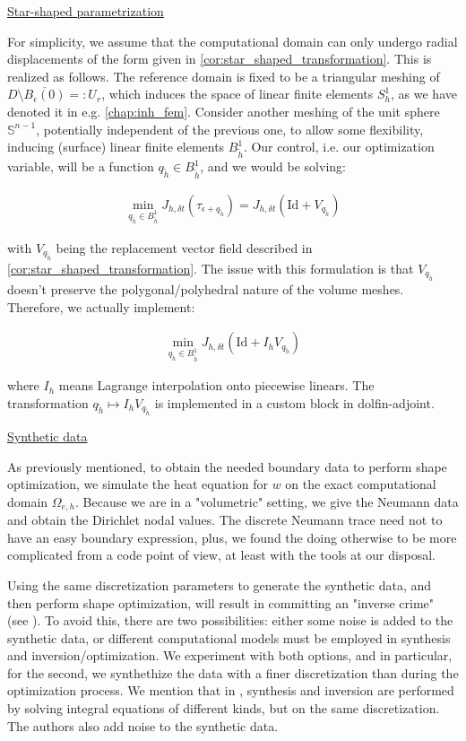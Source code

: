\documentclass[english,a4paper,9pt,oneside]{scrbook}	%
\theoremstyle{break}
\theoremstyle{remark}
\newcommand{\mS}{\mathbb{S}^{n-1}}
\newcommand{\id}{\text{Id}}
\newcommand{\eps}{\epsilon}
\begin{document}
\underline{Star-shaped parametrization}

For simplicity, we assume that the computational domain can only undergo radial displacements of the form given in \cref{cor:star_shaped_transformation}. This is realized as follows. The reference domain is fixed to be a triangular meshing of $D\setminus \overline{B_\epsilon(0)}=:U_r$, which induces the space of linear finite elements $S^1_h$, as we have denoted it in e.g. \cref{chap:inh_fem}. Consider another meshing of the unit sphere $\mS$, potentially independent of the previous one, to allow some flexibility, inducing (surface) linear finite elements $B^1_{\tilde{h}}$. Our control, i.e. our optimization variable, will be a function $ q_{\tilde{h}} \in B^1_{\tilde{h}}$, and we would be solving:

\begin{align*}
	\min_{q_{\tilde{h}} \in B^1_{\tilde{h}}} J_{h,\delta t}(\tau_{\eps+q_{\tilde{h}}}) = J_{h,\delta t }(\id  + V_{q_{\tilde{h}}})
\end{align*}

with $V_{q_{\tilde{h}}}$ being the replacement vector field described in  \cref{cor:star_shaped_transformation}. The issue with this formulation is that  $V_{q_{\tilde{h}}}$ doesn't preserve the polygonal/polyhedral nature of the volume meshes. Therefore, we actually implement:

\begin{align*}
	\min_{q_{\tilde{h}} \in B^1_{\tilde{h}}}J_{h,\delta t }(\id  + I_h V_{q_{\tilde{h}}})
\end{align*}

where $I_h$ means Lagrange interpolation onto piecewise linears. The transformation $q_{\tilde{h}} \mapsto I_h V_{q_{\tilde{h}}}$ is implemented in a custom block in dolfin-adjoint.

\underline{Synthetic data}

As previously mentioned, to obtain the needed boundary data to perform shape optimization, we simulate the heat equation for $w$ on the exact computational domain $\Omega_{e,h}$. Because we are in a "volumetric" setting, we give the Neumann data and obtain the Dirichlet nodal values. The discrete Neumann trace need not to have an easy boundary expression, plus, we found the doing otherwise to be more complicated from a code point of view, at least with the tools at our disposal.

Using the same discretization parameters to generate the synthetic data, and then perform shape optimization, will result in committing an "inverse crime" (see \cite{wirgin}). To avoid this, there are two possibilities: either some noise is added to the synthetic data, or different computational models must be employed in synthesis and inversion/optimization. We experiment with both options, and in particular, for the second, we synthethize the data with a finer discretization than during the optimization process. We mention that in \cite{harbrecht}, synthesis and inversion are performed by solving integral equations of different kinds, but on the same discretization. The authors also add noise to the synthetic data.  
\end{document}
